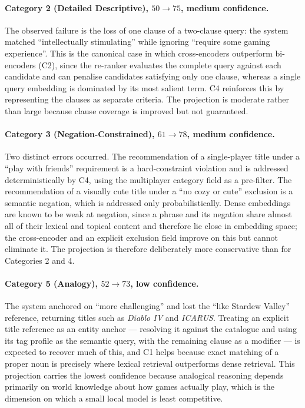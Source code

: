 \paragraph{Category 2 (Detailed Descriptive), $50 \rightarrow 75$, medium confidence.}
The observed failure is the loss of one clause of a two-clause query: the system
matched ``intellectually stimulating'' while ignoring ``require some gaming
experience''. This is the canonical case in which cross-encoders outperform
bi-encoders (C2), since the re-ranker evaluates the complete query against each
candidate and can penalise candidates satisfying only one clause, whereas a
single query embedding is dominated by its most salient term. C4 reinforces this
by representing the clauses as separate criteria. The projection is moderate
rather than large because clause coverage is improved but not guaranteed.

\paragraph{Category 3 (Negation-Constrained), $61 \rightarrow 78$, medium confidence.}
Two distinct errors occurred. The recommendation of a single-player title under a
``play with friends'' requirement is a hard-constraint violation and is addressed
deterministically by C4, using the multiplayer category field as a pre-filter.
The recommendation of a visually cute title under a ``no cozy or cute'' exclusion
is a semantic negation, which is addressed only probabilistically. Dense
embeddings are known to be weak at negation, since a phrase and its negation
share almost all of their lexical and topical content and therefore lie close in
embedding space; the cross-encoder and an explicit exclusion field improve on
this but cannot eliminate it. The projection is therefore deliberately more
conservative than for Categories 2 and 4.

\paragraph{Category 5 (Analogy), $52 \rightarrow 73$, low confidence.}
The system anchored on ``more challenging'' and lost the ``like Stardew Valley''
reference, returning titles such as \emph{Diablo IV} and \emph{ICARUS}. Treating
an explicit title reference as an entity anchor --- resolving it against the
catalogue and using its tag profile as the semantic query, with the remaining
clause as a modifier --- is expected to recover much of this, and C1 helps
because exact matching of a proper noun is precisely where lexical retrieval
outperforms dense retrieval. This projection carries the lowest confidence
because analogical reasoning depends primarily on world knowledge about how
games actually play, which is the dimension on which a small local model is least
competitive.

